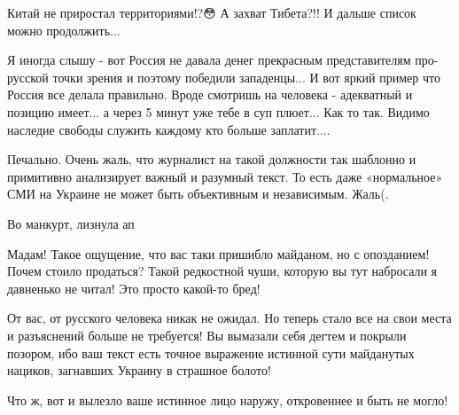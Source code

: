 \begin{itemize}
Китай не приростал территориями!?😳
А захват Тибета?!! И дальше список можно продолжить...

 

Я иногда слышу - вот Россия не давала денег прекрасным представителям
про-русской точки зрения и поэтому победили западенцы... И вот яркий пример что
Россия все делала правильно. Вроде смотришь на человека - адекватный и позицию
имеет... а через 5 минут уже тебе в суп плюет... Как то так. Видимо наследие
свободы служить каждому кто больше заплатит....


 

Печально. Очень жаль, что журналист на такой должности так шаблонно и
примитивно анализирует важный и разумный текст. То есть даже «нормальное» СМИ
на Украине не может быть объективным и независимым. Жаль(.


 
Во манкурт, лизнула ап

 

Мадам! Такое ощущение, что вас таки пришибло майданом, но с опозданием! Почем
стоило продаться? Такой редкостной чуши, которую вы тут набросали я давненько
не читал! Это просто какой-то бред! 

От вас, от русского человека никак не ожидал. Но теперь стало все на свои места
и разъяснений больше не требуется! Вы вымазали себя дегтем и покрыли позором,
ибо ваш текст есть точное выражение истинной сути майданутых нациков, загнавших
Украину в страшное болото! 

Что ж, вот и вылезло ваше истинное лицо наружу, откровеннее и быть не могло! 


\end{itemize}
